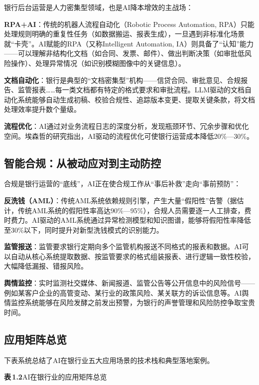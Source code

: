 银行后台运营是人力密集型领域，也是AI降本增效的主战场：

\textbf{RPA+AI}：传统的机器人流程自动化（Robotic Process Automation, RPA）只能处理规则明确的重复性任务（如数据搬运、报表生成），一旦遇到非标准化场景就``卡壳''。AI赋能的RPA（又称Intelligent Automation, IA）则具备了``认知''能力——可以理解非结构化文档（如合同、发票、邮件）、做出判断决策（如审批低风险操作）、处理异常情况（如识别模糊图像中的关键信息）。

\textbf{文档自动化}：银行是典型的``文档密集型''机构——信贷合同、审批意见、合规报告、监管报表……每一类文档都有特定的格式要求和审批流程。LLM驱动的文档自动化系统能够自动生成初稿、校验合规性、追踪版本变更、提取关键条款，将文档处理效率提升数个量级。

\textbf{流程优化}：AI通过对业务流程日志的深度分析，发现瓶颈环节、冗余步骤和优化空间。埃森哲的研究指出，AI驱动的流程优化可使银行运营成本降低20\%—30\%\parencite{accenture2023banking}。

\subsection{智能合规：从被动应对到主动防控}

合规是银行运营的``底线''，AI正在使合规工作从``事后补救''走向``事前预防''：

\textbf{反洗钱（AML）}：传统AML系统依赖规则引擎，产生大量``假阳性''告警（据估计，传统AML系统的假阳性率高达90\%—95\%），合规人员需要逐一人工排查，费时费力。AI驱动的AML系统通过异常检测模型和知识图谱，能够将假阳性率降低至30\%以下，同时提升对新型洗钱模式的识别能力。

\textbf{监管报送}：监管要求银行定期向多个监管机构报送不同格式的报表和数据。AI可以自动从核心系统提取数据、按监管要求的格式组装报表、进行逻辑一致性校验，大幅降低漏报、错报风险。

\textbf{舆情监控}：实时监测社交媒体、新闻报道、监管公告等公开信息中的风险信号——例如某客户企业的高管变动、某行业的政策风险、某关联方的诉讼信息等。AI舆情监控系统能够在风险发酵之前发出预警，为银行的声誉管理和风险防控争取宝贵时间。

\subsection{应用矩阵总览}

下表系统总结了AI在银行业五大应用场景的技术栈和典型落地案例。

\vspace{1em}

\noindent\textbf{表\,1.2}\quad AI在银行业的应用矩阵总览

